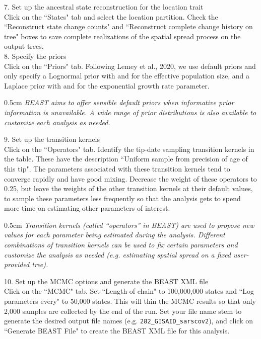 \documentclass{article}
\newcommand{\ann}[1]{
\begin{adjustwidth}{0.5cm}{}
\it{#1}\\
\end{adjustwidth}}
\newcommand{\code}[1]{
{\upshape\ttfamily{#1}}}
\begin{document}
7. Set up the ancestral state reconstruction for the location trait\\

Click on the ``States" tab and select the location partition. Check the ``Reconstruct state change counts" and ``Reconstruct complete change history on tree" boxes to save complete realizations of the spatial spread process on the output trees.\\

8. Specify the priors \\

Click on the ``Priors" tab. Following Lemey et al., 2020, %
we use default priors and only specify a Lognormal prior with \code{mu=0} and \code{sigma=10} for the effective population size, and a Laplace prior with \code{mean=0} and \code{scale=100} for the exponential growth rate parameter.\\

\ann{BEAST aims to offer sensible default priors when informative prior information is unavailable. A wide range of prior distributions is also available to customize each analysis as needed.}

9. Set up the transition kernels \\

Click on the ``Operators" tab. Identify the tip-date sampling transition kernels in the table.
These have the description ``Uniform sample from precision of age of this tip".
The parameters associated with these transition kernels tend to converge rapidly and have good mixing.
Decrease the weight of these operators to 0.25, but leave the weights of the other transition kernels at their default values, to sample these parameters less frequently so that the analysis gets to spend more time on estimating other parameters of interest.\\

\ann{Transition kernels (called ``operators'' in BEAST) are used to propose new values for each parameter being estimated during the analysis.
Different combinations of transition kernels can be used to fix certain parameters and customize the analysis as needed (e.g. estimating spatial spread on a fixed user-provided tree).}

10. Set up the MCMC options and generate the BEAST XML file\\

Click on the ``MCMC" tab. Set ``Length of chain" to 100,000,000 states and ``Log parameters every" to 50,000 states.
This will thin the MCMC results so that only 2,000 samples are collected by the end of the run.
Set your file name stem to generate the desired output file names (e.g. \texttt{282\_GISAID\_sarscov2}), and click on ``Generate BEAST File" to create the BEAST XML file for this analysis.\\
\end{document}
